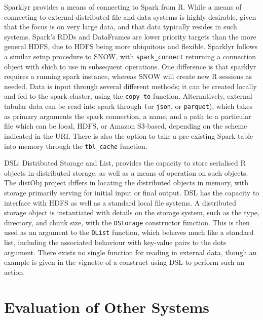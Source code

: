 \documentclass[a4paper,10pt]{article}
\begin{document}
Sparklyr provides a means of connecting to Spark from R\cite{luraschi20}.
While a means of connecting to external distributed file and data systems is
highly desirable, given that the focus is on very large data, and that data
typically resides in such systems, Spark's RDDs and DataFrames are lower
priority targets than the more general HDFS, due to HDFS being more ubiquitous
and flexible.
Sparklyr follows a similar setup procedure to SNOW, with
\texttt{spark\_connect} returning a connection object with shich to use
in subsequent operations.
One difference is that sparklyr requires a running spark instance, whereas SNOW
will create new R sessions as needed.
Data is input through several different methods; it can be created locally and fed to the spark cluster, using the \texttt{copy\_to} function.
Alternatively, external tabular data can be read into spark through
\texttt (or \texttt{json}, or
\texttt{parquet}), which takes as primary arguments the spark
connection, a name, and a path to a particular file which can be local, HDFS,
or Amazon S3-based, depending on the scheme indicated in the URI.
There is also the option to take a pre-existing Spark table into memory through
the \texttt{tbl\_cache} function.

DSL: Distributed Storage and List, provides the capacity to store serialised R
objects in distributed storage, as well as a means of operation on such
objects\cite{theussl2020dsl}.
The distObj project differs in locating the distributed objects in memory, with
storage primarily serving for initial input or final output.
DSL has the capacity to interface with HDFS as well as a standard local file systems.
A distributed storage object is instantiated with details on the storage
system, such as the type, directory, and chunk size, with the
\texttt{DStorage} constructor function.
This is then used as an argument to the \texttt{DList} function, which
behaves much like a standard list, including the associated behaviour with
key-value pairs to the dots argument.
There exists no single function for reading in external data, though an example
is given in the vignette of a construct using DSL to perform such an action.


\section{Evaluation of Other Systems}
\end{document}
